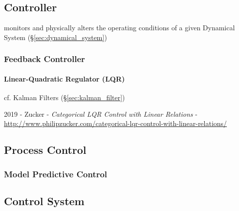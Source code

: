 \subsection{Controller}\label{sec:controller}


monitors and physically alters the operating conditions of a given
Dynamical System (\S\ref{sec:dynamical_system})



\subsubsection{Feedback Controller}\label{sec:feedback_controller}

\paragraph{Linear-Quadratic Regulator (LQR)}\label{sec:lqr}\hfill

cf. Kalman Filters (\S\ref{sec:kalman_filter})

2019 - Zucker - \emph{Categorical LQR Control with Linear Relations} -
  \url{http://www.philipzucker.com/categorical-lqr-control-with-linear-relations/}



\subsection{Process Control}\label{sec:process_control}

\subsubsection{Model Predictive Control}\label{sec:model_predictive_control}



\subsection{Control System}\label{sec:control_system}

